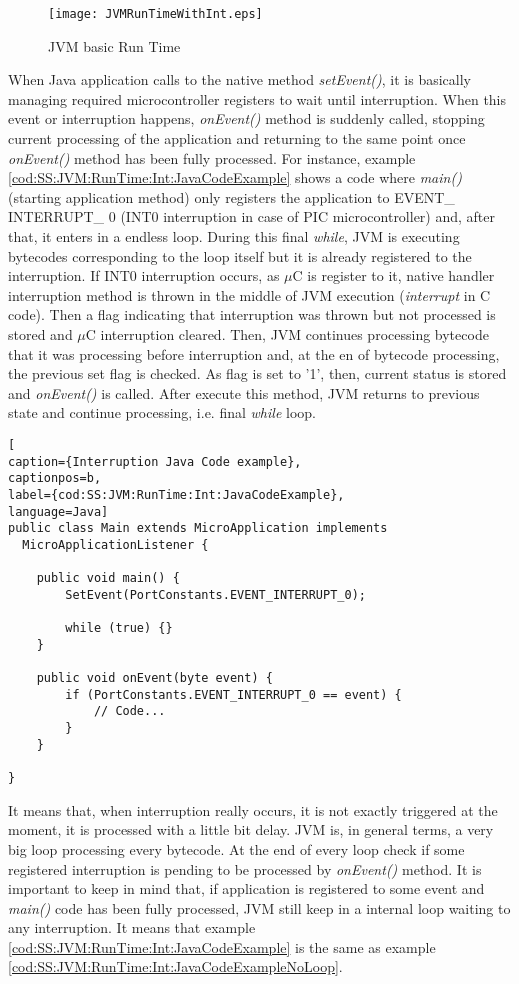 \begin{figure}[H]
\centering
\texttt{[image: JVMRunTimeWithInt.eps]}
\caption{JVM basic Run Time}
\label{fig:JVMRunTimeWithInt}
\end{figure}

When Java application calls to the native method \textit{setEvent()}, it is basically managing required microcontroller registers to wait until interruption. When this event or interruption happens, \textit{onEvent()} method is suddenly called, stopping current processing of the application and returning to the same point once \textit{onEvent()} method has been fully processed. For instance, example \ref{cod:SS:JVM:RunTime:Int:JavaCodeExample} shows a code where \textit{main()} (starting application method) only registers the application to EVENT\_ INTERRUPT\_ 0 (INT0 interruption in case of PIC microcontroller) and, after that, it enters in a endless loop. During this final \textit{while}, JVM is executing bytecodes corresponding to the loop itself but it is already registered to the interruption. If INT0 interruption occurs, as $\mu$C is register to it, native handler interruption method is thrown in the middle of JVM execution (\textit{interrupt} in C code). Then a flag indicating that interruption was thrown but not processed is stored and $\mu$C interruption cleared. Then, JVM continues processing bytecode that it was processing before interruption and, at the en of bytecode processing, the previous set flag is checked. As flag is set to '1', then, current status is stored and \textit{onEvent()} is called. After execute this method, JVM returns to previous state and continue processing, i.e. final \textit{while} loop.

\medskip
\begin{lstlisting}[
caption={Interruption Java Code example},
captionpos=b,
label={cod:SS:JVM:RunTime:Int:JavaCodeExample},
language=Java]
public class Main extends MicroApplication implements
  MicroApplicationListener {

    public void main() {
        SetEvent(PortConstants.EVENT_INTERRUPT_0);

        while (true) {}
    }

    public void onEvent(byte event) {
        if (PortConstants.EVENT_INTERRUPT_0 == event) {
            // Code...
        }
    }

}
\end{lstlisting}
\medskip

It means that, when interruption really occurs, it is not exactly triggered at the moment, it is processed with a little bit delay. JVM is, in general terms, a very big loop processing every bytecode. At the end of every loop check if some registered interruption is pending to be processed by \textit{onEvent()} method. It is important to keep in mind that, if application is registered to some event and \textit{main()} code has been fully processed, JVM still keep in a internal loop waiting to any interruption. It means that example \ref{cod:SS:JVM:RunTime:Int:JavaCodeExample} is the same as example \ref{cod:SS:JVM:RunTime:Int:JavaCodeExampleNoLoop}.

